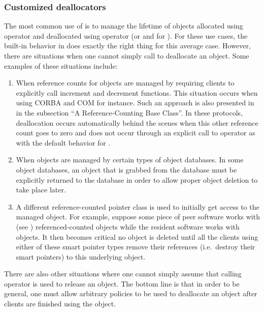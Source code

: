 \documentclass[pdf,ps2pdf,11pt]{SANDreport}
\begin{document}
%
{}\subsubsection{Customized deallocators}
\label{sec:deallocators}
%

The most common use of {} is to manage the lifetime of
objects allocated using operator {} and deallocated using
operator {} (or {} and {} for {}).  For these use cases, the built-in
behavior in {} does exactly the right thing for this
average case.  However, there are situations when one cannot simply
call {} to deallocate an object.  Some examples of
these situations include:

\begin{enumerate}

{}\item When reference counts for objects are managed by requiring
clients to explicitly call increment and decrement functions.  This
situation occurs when using CORBA {}\cite{ref:corba} and COM
{}\cite{ref:com} for instance.  Such an approach is also presented in
{}\cite[Item 29]{MoreEffectiveC++96} in the subsection ``A
Reference-Counting Base Class''.  In these protocols, deallocation
occurs automatically behind the scenes when this other reference count
goes to zero and does not occur through an explicit call to operator
{} as with the default behavior for {}.

{}\item When objects are managed by certain types of object databases.
In some object databases, an object that is grabbed from the database
must be explicitly returned to the database in order to allow proper
object deletion to take place later.

{}\item A different reference-counted pointer class is used to
initially get access to the managed object.  For example, suppose some
piece of peer software works with {} (see
{}\cite{ref:boost}) referenced-counted objects while the resident
software works with {} objects.  It then becomes critical
no object is deleted until all the clients using either of these smart
pointer types remove their references (i.e.\ destroy their smart
pointers) to this underlying object.

\end{enumerate}

There are also other situations where one cannot simply assume that
calling operator {} is used to release an object.  The
bottom line is that in order to be general, one must allow arbitrary
policies to be used to deallocate an object after clients are finished
using the object.
\end{document}
